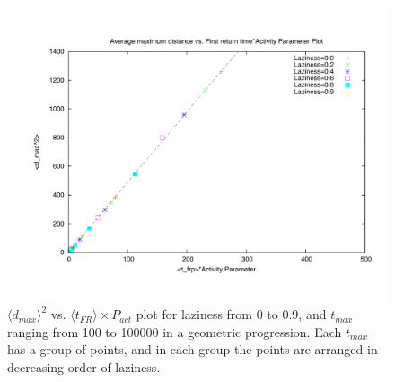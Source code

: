 \documentclass[12pt]{article}
\begin{document}
\newpage
\begin{figure}
\centering
\includegraphics[width=\textwidth]{tfrp_scaled.pdf}
\caption{$\langle d_{{max}} \rangle ^2$ vs. $\langle t_{FR} \rangle\times P_{act}$ plot for laziness from 0 to 0.9, and $t_{max}$ ranging from 100 to 100000 in a geometric progression. Each $t_{max}$ has a group of points, and in each group the points are arranged in decreasing order of laziness.}
\label{fig:pow_law2}
\end{figure}
\end{document}
